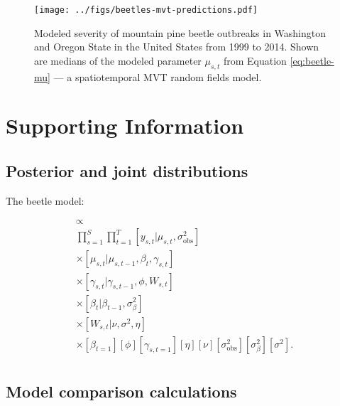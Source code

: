 \documentclass[12pt,english]{article}
\begin{document}
\begin{spacing}{1.3}
\clearpage

\begin{figure}[htb]
  \begin{center}
    \texttt{[image: ../figs/beetles-mvt-predictions.pdf]}
    \caption{Modeled severity of mountain pine beetle outbreaks in Washington and
      Oregon State in the United States from 1999 to 2014.
      Shown are medians of the modeled parameter $\mu_{s,t}$ from Equation \ref{eq:beetle-mu}
      --- a spatiotemporal MVT random fields model.
    }
    \label{fig:beetle-pred}
  \end{center}
\end{figure}


\end{spacing}

\clearpage

\section{Supporting Information}

\subsection{Posterior and joint distributions}

The beetle model:

\begin{multline}
  [\bm{\mu},
  \bm{\gamma},
  \bm{W},
  \bm{\beta},
  \phi,
  \eta,
  \nu,
  \sigma^2_{\mathrm{obs}},
  \sigma^2_{\beta},
  \sigma^2
  |
  \bm{y}]
  \propto \\
  \prod_{s=1}^{S} \prod_{t=1}^{T}
  [y_{s,t} | \mu_{s,t}, \sigma^2_{\mathrm{obs}}] \\
  \times [\mu_{s,t} | \mu_{s,t-1}, \beta_t, \gamma_{s,t} ] \\
  \times [\gamma_{s,t} | \gamma_{s,t-1}, \phi, W_{s,t}] \\
  \times [\beta_t | \beta_{t-1}, \sigma^2_{\beta}] \\
  \times [W_{s,t} | \nu, \sigma^2, \eta] \\
  \times
  [\beta_{t=1}]
  [\phi]
  [\gamma_{s,t=1}]
  [\eta]
  [\nu]
  [\sigma^2_{\mathrm{obs}}]
  [\sigma^2_{\beta}]
  [\sigma^2].
  \\
\end{multline}

\subsection{Model comparison calculations}
\end{document}
